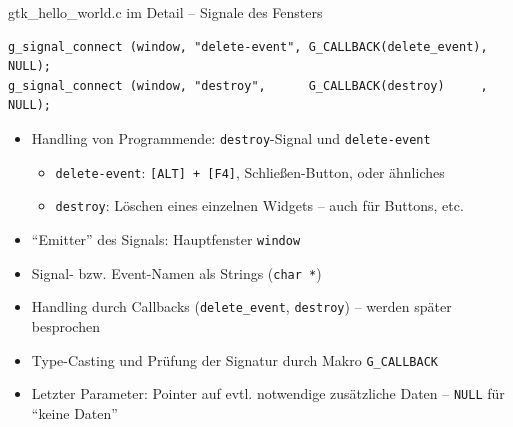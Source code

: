 \begin{frame}[fragile]{gtk\_hello\_world.c im Detail -- Signale des Fensters}
%
\begin{verbatim}
g_signal_connect (window, "delete-event", G_CALLBACK(delete_event), NULL);
g_signal_connect (window, "destroy",      G_CALLBACK(destroy)     , NULL);
\end{verbatim}
%
\begin{itemize}
\item Handling von Programmende: \texttt{destroy}-Signal und \texttt{delete-event}
	\begin{itemize}
	\item \texttt{delete-event}: \texttt{[ALT] + [F4]}, Schließen-Button, oder ähnliches
	\item \texttt{destroy}: Löschen eines einzelnen Widgets -- auch für Buttons, etc.
	\end{itemize}
\item \enquote{Emitter} des Signals: Hauptfenster \texttt{window}
\item Signal- bzw. Event-Namen als Strings (\texttt{char *})
\item Handling durch Callbacks (\texttt{delete\_event}, \texttt{destroy}) -- werden später besprochen
\item Type-Casting und Prüfung der Signatur durch Makro \texttt{G\_CALLBACK}
\item Letzter Parameter: Pointer auf evtl. notwendige zusätzliche Daten -- 
	\texttt{NULL} für \enquote{keine Daten}
\end{itemize}
%
\end{frame}


